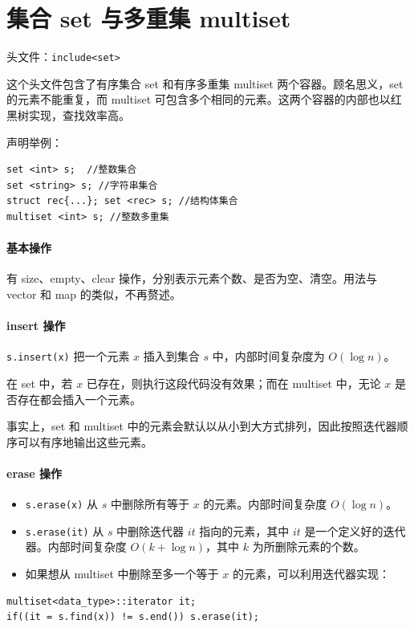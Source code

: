 \documentclass[UTF8]{ctexart}
\newcommand\Emph[1]{\colorbox{green!10}{\textcolor{green!30!black}{#1}}}
\begin{document}
\section{集合 set 与多重集 multiset}
头文件：\verb!include<set>!

这个头文件包含了有序集合 set 和有序多重集 multiset 两个容器。顾名思义，set 的元素不能重复，而 multiset 可包含多个相同的元素。这两个容器的内部也以红黑树实现，查找效率高。

声明举例：
\begin{lstlisting}[numbers=none]
set <int> s;  //整数集合
set <string> s; //字符串集合
struct rec{...}; set <rec> s; //结构体集合
multiset <int> s; //整数多重集
\end{lstlisting}

\paragraph{基本操作} 有 size、empty、clear 操作，分别表示元素个数、是否为空、清空。用法与 vector 和 map 的类似，不再赘述。

\paragraph{insert 操作} \verb!s.insert(x)! 把一个元素 $x$ 插入到集合 $s$ 中，内部时间复杂度为 $O(\log n)$。

在 set 中，若 $x$ 已存在，则执行这段代码没有效果；而在 multiset 中，无论 $x$ 是否存在都会插入一个元素。

{\color{gray}\small 事实上，set 和 multiset 中的元素会默认以从小到大方式排列，因此按照迭代器顺序可以有序地输出这些元素。}

\paragraph{erase 操作}
\begin{itemize}
    \item \verb!s.erase(x)! 从 $s$ 中删除\Emph{所有}等于 $x$ 的元素。内部时间复杂度 $O(\log n)$。
    \item \verb!s.erase(it)! 从 $s$ 中删除迭代器 $it$ 指向的元素，其中 $it$ 是一个定义好的迭代器。内部时间复杂度 $O(k+\log n)$，其中 $k$ 为所删除元素的个数。
    \item 如果想从 multiset 中删除至多一个等于 $x$ 的元素，可以利用迭代器实现：
\end{itemize}
\begin{lstlisting}[numbers=none]
multiset<data_type>::iterator it;
if((it = s.find(x)) != s.end()) s.erase(it);
\end{lstlisting}
\end{document}
